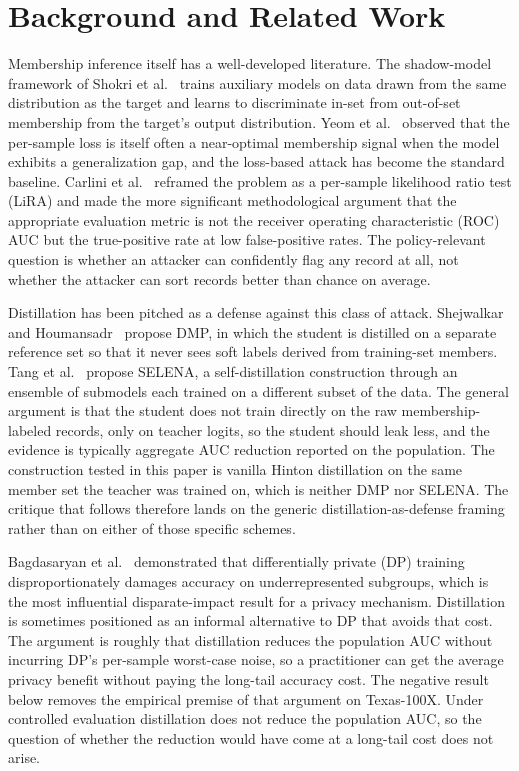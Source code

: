 \documentclass[conference]{IEEEtran}
\begin{document}
\section*{Background and Related Work}

Membership inference itself has a well-developed literature. The shadow-model framework of Shokri et al.~\cite{shokri2017} trains auxiliary models on data drawn from the same distribution as the target and learns to discriminate in-set from out-of-set membership from the target's output distribution. Yeom et al.~\cite{yeom2018} observed that the per-sample loss is itself often a near-optimal membership signal when the model exhibits a generalization gap, and the loss-based attack has become the standard baseline. Carlini et al.~\cite{carlini2022} reframed the problem as a per-sample likelihood ratio test (LiRA) and made the more significant methodological argument that the appropriate evaluation metric is not the receiver operating characteristic (ROC) AUC but the true-positive rate at low false-positive rates. The policy-relevant question is whether an attacker can confidently flag any record at all, not whether the attacker can sort records better than chance on average.

Distillation has been pitched as a defense against this class of attack. Shejwalkar and Houmansadr~\cite{shejwalkar2021} propose DMP, in which the student is distilled on a separate reference set so that it never sees soft labels derived from training-set members. Tang et al.~\cite{tang2022} propose SELENA, a self-distillation construction through an ensemble of submodels each trained on a different subset of the data. The general argument is that the student does not train directly on the raw membership-labeled records, only on teacher logits, so the student should leak less, and the evidence is typically aggregate AUC reduction reported on the population. The construction tested in this paper is vanilla Hinton distillation on the same member set the teacher was trained on, which is neither DMP nor SELENA. The critique that follows therefore lands on the generic distillation-as-defense framing rather than on either of those specific schemes.

Bagdasaryan et al.~\cite{bagdasaryan2019} demonstrated that differentially private (DP) training disproportionately damages accuracy on underrepresented subgroups, which is the most influential disparate-impact result for a privacy mechanism. Distillation is sometimes positioned as an informal alternative to DP that avoids that cost. The argument is roughly that distillation reduces the population AUC without incurring DP's per-sample worst-case noise, so a practitioner can get the average privacy benefit without paying the long-tail accuracy cost. The negative result below removes the empirical premise of that argument on Texas-100X. Under controlled evaluation distillation does not reduce the population AUC, so the question of whether the reduction would have come at a long-tail cost does not arise.
\end{document}
